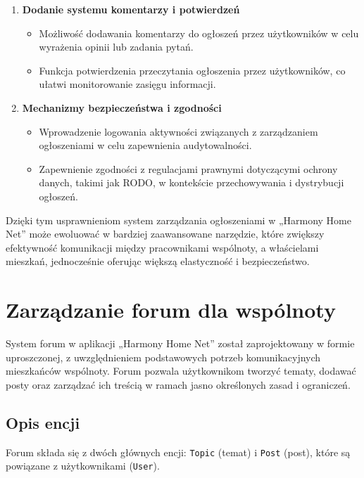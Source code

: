 \begin{enumerate}
    \item \textbf{Dodanie systemu komentarzy i potwierdzeń}
    \begin{itemize}
        \item Możliwość dodawania komentarzy do ogłoszeń przez użytkowników w celu wyrażenia opinii lub zadania pytań.
        \item Funkcja potwierdzenia przeczytania ogłoszenia przez użytkowników, co ułatwi monitorowanie zasięgu informacji.
    \end{itemize}

    \item \textbf{Mechanizmy bezpieczeństwa i zgodności}
    \begin{itemize}
        \item Wprowadzenie logowania aktywności związanych z zarządzaniem ogłoszeniami w celu zapewnienia audytowalności.
        \item Zapewnienie zgodności z regulacjami prawnymi dotyczącymi ochrony danych, takimi jak RODO, w kontekście przechowywania i dystrybucji ogłoszeń.
    \end{itemize}
\end{enumerate}

Dzięki tym usprawnieniom system zarządzania ogłoszeniami w „Harmony Home Net” może ewoluować w bardziej zaawansowane narzędzie, które zwiększy efektywność komunikacji między pracownikami wspólnoty, a właścielami mieszkań, jednocześnie oferując większą elastyczność i bezpieczeństwo.


\section{Zarządzanie forum dla wspólnoty}

System forum w aplikacji „Harmony Home Net” został zaprojektowany w formie uproszczonej, z uwzględnieniem podstawowych potrzeb komunikacyjnych mieszkańców wspólnoty. Forum pozwala użytkownikom tworzyć tematy, dodawać posty oraz zarządzać ich treścią w ramach jasno określonych zasad i ograniczeń.

\subsection{Opis encji}
Forum składa się z dwóch głównych encji: \texttt{Topic} (temat) i \texttt{Post} (post), które są powiązane z użytkownikami (\texttt{User}).

